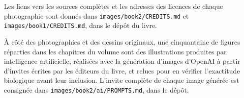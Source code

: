 Les liens vers les sources complètes et les adresses des licences de
chaque photographie sont donnés dans
\texttt{images/\allowbreak book2/\allowbreak CREDITS.md} et \texttt{images/\allowbreak book1/\allowbreak CREDITS.md},
dans le dépôt du livre.

\bigskip
À côté des photographies et des dessins originaux, une cinquantaine de
figures réparties dans les chapitres du volume sont des illustrations
produites par intelligence artificielle, réalisées avec la génération
d'images d'OpenAI à partir d'invites écrites par les éditeurs du livre,
et relues pour en vérifier l'exactitude biologique avant leur
inclusion. L'invite complète de chaque image générée est consignée dans
\texttt{images/\allowbreak book2/\allowbreak ai/\allowbreak PROMPTS.md}, dans le dépôt.
\par\endgroup
\clearpage
